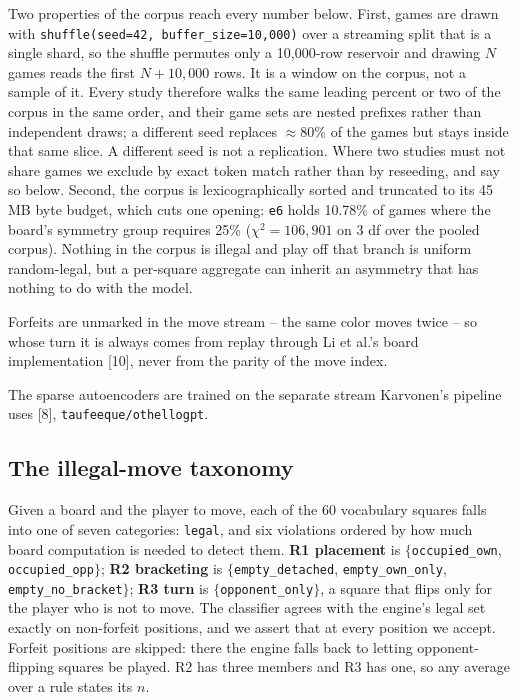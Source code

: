 Two properties of the corpus reach every number below. First, games are drawn with
\texttt{shuffle(seed=42, buffer\_size=10{,}000)} over a streaming split that is a single shard,
so the shuffle permutes only a 10,000-row reservoir and drawing $N$ games reads the first
$N + 10{,}000$ rows. It is a window on the corpus, not a sample of it. Every study therefore walks the same leading percent or two of the
corpus in the same order, and their game sets are nested prefixes rather than independent
draws; a different seed replaces $\approx 80\%$ of the games but stays inside that same slice. A
different seed is not a replication.
Where two studies must not share games we exclude by exact token match rather than by
reseeding, and say so below. Second, the corpus is lexicographically sorted and truncated to
its 45\,MB byte budget, which cuts one opening: \texttt{e6} holds 10.78\% of games where the
board's symmetry group requires 25\% ($\chi^2 = 106{,}901$ on 3 df over the pooled corpus). Nothing in the corpus is
illegal and play off that branch is uniform random-legal, but a per-square aggregate can
inherit an asymmetry that has nothing to do with the model.

Forfeits are unmarked in the move stream -- the same color moves twice -- so whose turn it
is always comes from replay through Li et al.'s board implementation [10], never from the
parity of the move index.

The sparse autoencoders are trained on the separate stream Karvonen's pipeline uses [8],
\texttt{taufeeque/othellogpt}.

\subsection{The illegal-move taxonomy}

Given a board and the player to move, each of the 60 vocabulary squares falls into one of seven
categories: \texttt{legal}, and six violations ordered by how much board computation is needed
to detect them. \textbf{R1 placement} is $\{$\texttt{occupied\_own}, \texttt{occupied\_opp}$\}$;
\textbf{R2 bracketing} is $\{$\texttt{empty\_detached}, \texttt{empty\_own\_only},
\texttt{empty\_no\_bracket}$\}$; \textbf{R3 turn} is $\{$\texttt{opponent\_only}$\}$, a square
that flips only for the player who is not to move. The classifier agrees with the engine's legal
set exactly on non-forfeit positions, and we assert that at every position we accept. Forfeit
positions are skipped: there the engine falls back to letting opponent-flipping squares be
played. R2 has three members and R3 has one, so any average over a rule states its $n$.

